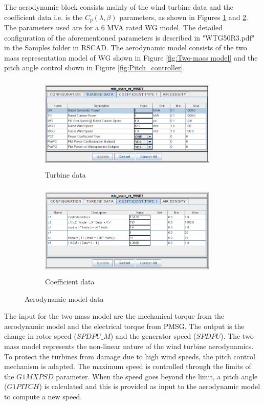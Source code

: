 The aerodynamic block consists mainly of the wind turbine data and the coefficient data i.e. is the $C_p(\lambda,\beta)$ parameters, as shown in Figures \ref{fig:Turbine_data} and \ref{fig:Coeff_type}. The parameters used are for a 6 MVA rated \gls{WG} model. The detailed configuration of the aforementioned parameters is described in "WTG50R3.pdf" in the Samples folder in RSCAD. The aerodynamic model consists of the two mass representation model of \gls{WG} shown in Figure \ref{fig:Two-mass model} and the pitch angle control shown in Figure \ref{fig:Pitch_controller}. 

\begin{figure}[H]
\centering
\begin{subfigure}{.55\textwidth}
  \centering
  \includegraphics[height=4.5cm,width=8.5cm]{Diagrams/Appendix_A/Turbine_data.PNG}
  \caption{Turbine data}
  \label{fig:Turbine_data}
\end{subfigure}%
\begin{subfigure}{.45\textwidth}
  \centering
  \includegraphics[height=4.5cm,width=8.5cm]{Diagrams/Appendix_A/Coeff_type.PNG}
  \caption{Coefficient data}
  \label{fig:Coeff_type}
\end{subfigure}
\caption{Aerodynamic model data}
\label{fig:aerodynamic_model_data}
\end{figure}

The input for the two-mass model are the mechanical torque from the aerodynamic model and the electrical torque from \gls{PMSG}. The output is the change in rotor speed ($SPDPU\_M$) and the generator speed ($SPDPU$). The two-mass model represents the non-linear nature of the wind turbine aerodynamics. To protect the turbines from damage due to high wind speeds, the pitch control mechanism is adapted. The maximum speed is controlled through the limits of the $G1MXPSD$ parameter. When the speed goes beyond the limit, a pitch angle ($G1PITCH$) is calculated and this is provided as input to the aerodynamic model to compute a new speed.  

